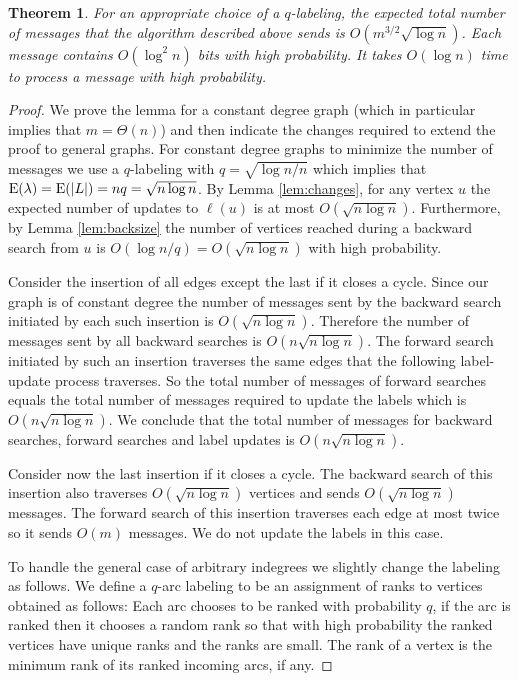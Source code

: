 \documentclass[11pt]{article}
\theoremstyle{plain}
\newtheorem{thm}{Theorem}[section]
\theoremstyle{definition}
\theoremstyle{remark}
\numberwithin{equation}{section}
\begin{document}
\begin{thm} \label{thm:32}
For an appropriate choice of a $q$-labeling, the expected total
number of messages that the algorithm described above sends is
$O(m^{3/2}\sqrt{\log n})$. Each message contains $O(\log^2 n)$ bits
with high probability. It takes $O(\log n)$ time to process a
message with high probability.
\end{thm}
\begin{proof}
We prove the lemma for a constant degree graph (which in particular
implies that $m=\Theta(n)$) and then indicate the changes required
to extend the proof to general graphs.
 For constant degree graphs to minimize the number of messages we use a $q$-labeling with
$q=\sqrt{\log n/n}$ which implies that $\operatorname{E}(\lambda) = \operatorname{E}(|L|) = nq =
\sqrt{n \log n}$. By Lemma \ref{lem:changes}, for any vertex $u$ the
expected number of updates to $\ell(u)$ is at most $O(\sqrt{ n\log
n})$. Furthermore, by Lemma \ref{lem:backsize} the
 number of vertices reached during a backward search from
$u$ is $O(\log n/q)= O(\sqrt{ n \log n})$ with high probability.

Consider the insertion of all edges except the last if it closes a
 cycle. Since our graph is of constant degree
the  number of messages sent by the backward search initiated by
each such insertion is $O(\sqrt{ n \log n})$. Therefore the number
of messages sent by all backward searches is $O(n\sqrt{ n \log n})$.
The forward search initiated by such an insertion traverses the same
edges that the following label-update process traverses. So the
total number of messages of forward searches equals  the total
number of messages required to update the labels which is $O(n\sqrt{
n \log n})$. We conclude that the total number of messages for
backward searches, forward searches and label updates is $O(n\sqrt{
n \log n})$.



Consider now the last insertion if it closes a cycle. The backward
search of this insertion also traverses $O(\sqrt{ n \log n})$
 vertices and sends $O(\sqrt{ n \log n})$ messages. The forward search of
 this insertion traverses each edge at most twice so it sends $O(m)$
 messages. We do not update the labels in this case.

To handle the general case of arbitrary indegrees we slightly change
the labeling as follows. We define a $q$-arc labeling to be an
assignment of ranks to vertices obtained as follows: Each arc
chooses to be ranked with probability $q$, if the arc is ranked then
it chooses a random rank so that with high probability the ranked
vertices have unique ranks and the ranks are small. The rank of a
vertex is the minimum rank of its ranked incoming arcs, if any.


\end{proof}
\end{document}
